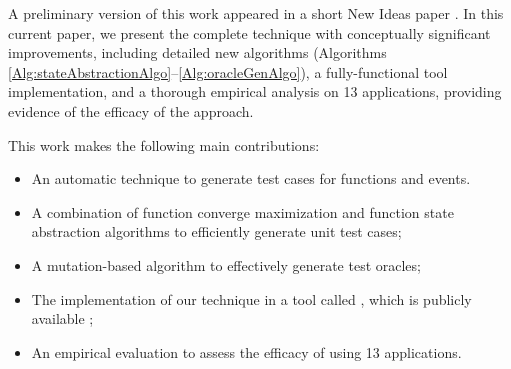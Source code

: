 %

A preliminary version of this work appeared in a short New Ideas paper \cite{shabnam:ase13}. In this current paper, we present the complete technique with conceptually significant improvements, including detailed new algorithms (Algorithms \ref{Alg:stateAbstractionAlgo}--\ref{Alg:oracleGenAlgo}), a fully-functional tool implementation, and a thorough empirical analysis on 13 \javascript applications, providing evidence of the efficacy of the approach.

This work makes the following main contributions:
\begin{itemize}

\item An automatic technique to generate test cases for \javascript functions and events.

\item A combination of function converge maximization and function state abstraction algorithms to efficiently generate unit test cases;
\item A mutation-based algorithm to effectively generate test oracles;%
\item The implementation of our technique in a tool called \tool, which is publicly available \cite{jseft-dl};%
\item An empirical evaluation to assess the efficacy of \tool using 13 \javascript applications.
\end{itemize} 

